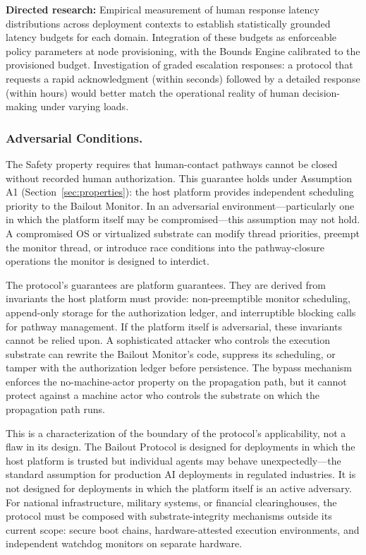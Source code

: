 \textbf{Directed research:} Empirical measurement of human response latency distributions across deployment contexts to establish statistically grounded latency budgets for each domain. Integration of these budgets as enforceable policy parameters at node provisioning, with the Bounds Engine calibrated to the provisioned budget. Investigation of graded escalation responses: a protocol that requests a rapid acknowledgment (within seconds) followed by a detailed response (within hours) would better match the operational reality of human decision-making under varying loads.

\subsubsection{Adversarial Conditions.}
The Safety property requires that human-contact pathways cannot be closed without recorded human authorization. This guarantee holds under Assumption A1 (Section~\ref{sec:properties}): the host platform provides independent scheduling priority to the Bailout Monitor. In an adversarial environment---particularly one in which the platform itself may be compromised---this assumption may not hold. A compromised OS or virtualized substrate can modify thread priorities, preempt the monitor thread, or introduce race conditions into the pathway-closure operations the monitor is designed to interdict.

The protocol's guarantees are platform guarantees. They are derived from invariants the host platform must provide: non-preemptible monitor scheduling, append-only storage for the authorization ledger, and interruptible blocking calls for pathway management. If the platform itself is adversarial, these invariants cannot be relied upon. A sophisticated attacker who controls the execution substrate can rewrite the Bailout Monitor's code, suppress its scheduling, or tamper with the authorization ledger before persistence. The bypass mechanism enforces the no-machine-actor property on the propagation path, but it cannot protect against a machine actor who controls the substrate on which the propagation path runs.

This is a characterization of the boundary of the protocol's applicability, not a flaw in its design. The Bailout Protocol is designed for deployments in which the host platform is trusted but individual agents may behave unexpectedly---the standard assumption for production AI deployments in regulated industries. It is not designed for deployments in which the platform itself is an active adversary. For national infrastructure, military systems, or financial clearinghouses, the protocol must be composed with substrate-integrity mechanisms outside its current scope: secure boot chains, hardware-attested execution environments, and independent watchdog monitors on separate hardware.

